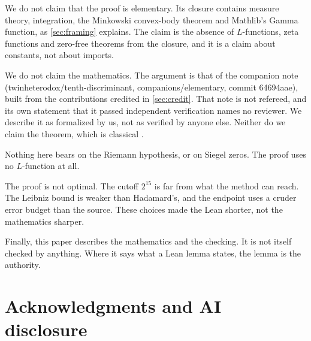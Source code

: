 \documentclass[11pt]{article}
\theoremstyle{definition}
\begin{document}
We do not claim that the proof is elementary. Its closure contains measure theory, integration, the Minkowski convex-body theorem and Mathlib's Gamma function, as \cref{sec:framing} explains. The claim is the absence of $L$-functions, zeta functions and zero-free theorems from the closure, and it is a claim about constants, not about imports.

We do not claim the mathematics. The argument is that of the companion note (twinheterodox/tenth-discriminant, companions/elementary, commit 64694aae), built from the contributions credited in \cref{sec:credit}. That note is not refereed, and its own statement that it passed independent verification names no reviewer. We describe it as formalized by us, not as verified by anyone else. Neither do we claim the theorem, which is classical \cite{Heegner1952,Baker1966,Stark1967}.

Nothing here bears on the Riemann hypothesis, or on Siegel zeros. The proof uses no $L$-function at all.

The proof is not optimal. The cutoff $2^{15}$ is far from what the method can reach. The Leibniz bound is weaker than Hadamard's, and the endpoint uses a cruder error budget than the source. These choices made the Lean shorter, not the mathematics sharper.

Finally, this paper describes the mathematics and the checking. It is not itself checked by anything. Where it says what a Lean lemma states, the lemma is the authority.



\section*{Acknowledgments and AI disclosure}
\end{document}
